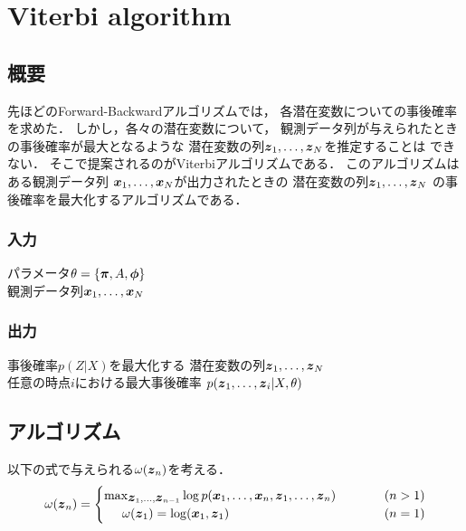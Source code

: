 \section{Viterbi algorithm}
\label{sec:Viterbi}
\subsection{概要}
\label{sec:Viterbi:abst}
先ほどのForward-Backwardアルゴリズムでは，
各潜在変数についての事後確率を求めた．
しかし，各々の潜在変数について，
観測データ列が与えられたときの事後確率が最大となるような
潜在変数の列$\mbox{\boldmath $z$}_1,\dots,\mbox{\boldmath $z$}_N$を推定することは
できない．
そこで提案されるのがViterbiアルゴリズムである．
このアルゴリズムはある観測データ列
$\mbox{\boldmath $x$}_1,\dots,\mbox{\boldmath $x$}_N$が出力されたときの
潜在変数の列$\mbox{\boldmath $z$}_1,\dots,\mbox{\boldmath $z$}_N$
の事後確率を最大化するアルゴリズムである．
\subsubsection{入力}
\label{sec:Viterbi:input}
パラメータ$\theta = \{\mbox{\boldmath $\pi$}, A, \mbox{\boldmath $\phi$}\}$ \\
\hphantom{観}観測データ列$\mbox{\boldmath $x$}_1,\dots,\mbox{\boldmath $x$}_N$
\subsubsection{出力}
\label{sec:Viterbi:output}
事後確率$p(Z|X)$を最大化する
潜在変数の列$\mbox{\boldmath $z$}_1,\dots,\mbox{\boldmath $z$}_N$ \\
\hphantom{潜}任意の時点$i$における最大事後確率
$p(\mbox{\boldmath $z$}_1,\dots,\mbox{\boldmath $z$}_i|X,\theta)$
\subsection{アルゴリズム}
\label{sec:Viterbi:algorithm}
以下の式で与えられる$\omega(\mbox{\boldmath $z$}_n)$を考える．
\begin{align}
  \omega(\bvec{z}_n) =
  \begin{cases}
    \max_{\bvec{z}_1,\dots,\bvec{z}_{n-1}}\log p(\bvec{x}_1,\dots,\bvec{x}_n,\bvec{z}_1,\dots,\bvec{z}_n)\hspace{10mm}&(n > 1) \label{eq:Viterbi:omega-induction}\\
    \hspace{5mm}\omega(\bvec{z}_1) = \log (\bvec{x}_1,\bvec{z}_1)\hspace{5mm}&(n = 1)\\
  \end{cases}
\end{align}

